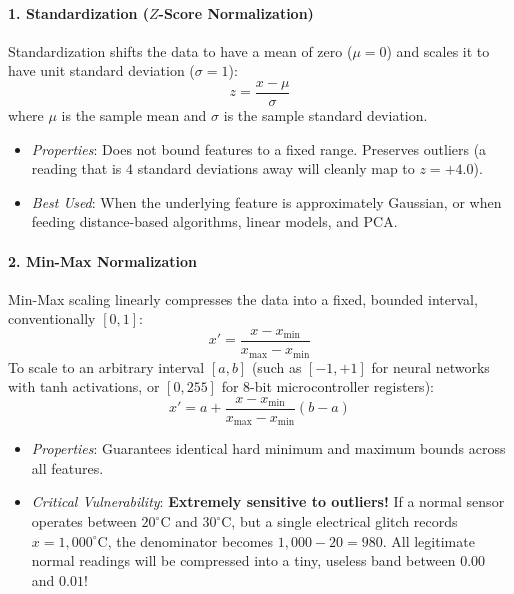 \paragraph{1. Standardization ($Z$-Score Normalization)}
Standardization shifts the data to have a mean of zero ($\mu = 0$) and scales it to have unit standard deviation ($\sigma = 1$):
\begin{equation}
z = \frac{x - \mu}{\sigma}\label{eq:standardization}
\end{equation}
where $\mu$ is the sample mean and $\sigma$ is the sample standard deviation.
\begin{itemize}
    \item \textit{Properties}: Does not bound features to a fixed range. Preserves outliers (a reading that is $4$ standard deviations away will cleanly map to $z = +4.0$).
    \item \textit{Best Used}: When the underlying feature is approximately Gaussian, or when feeding distance-based algorithms, linear models, and PCA.
\end{itemize}

\paragraph{2. Min-Max Normalization}
Min-Max scaling linearly compresses the data into a fixed, bounded interval, conventionally $[0, 1]$:
\begin{equation}
x' = \frac{x - x_{\min}}{x_{\max} - x_{\min}}\label{eq:minmax_scaling}
\end{equation}
To scale to an arbitrary interval $[a, b]$ (such as $[-1, +1]$ for neural networks with tanh activations, or $[0, 255]$ for 8-bit microcontroller registers):
\begin{equation}
x' = a + \frac{x - x_{\min}}{x_{\max} - x_{\min}} (b - a)\label{eq:minmax_arbitrary}
\end{equation}
\begin{itemize}
    \item \textit{Properties}: Guarantees identical hard minimum and maximum bounds across all features.
    \item \textit{Critical Vulnerability}: \textbf{Extremely sensitive to outliers!} If a normal sensor operates between $20^\circ\text{C}$ and $30^\circ\text{C}$, but a single electrical glitch records $x = 1{,}000^\circ\text{C}$, the denominator becomes $1{,}000 - 20 = 980$. All legitimate normal readings will be compressed into a tiny, useless band between $0.00$ and $0.01$!
\end{itemize}

